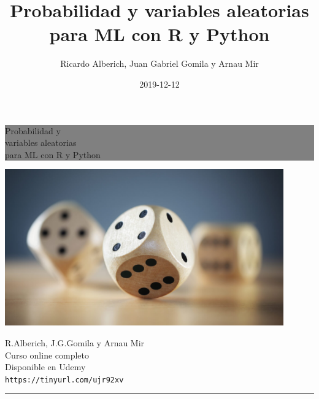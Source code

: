 \documentclass[]{book}
\title{Probabilidad y variables aleatorias para ML con R y Python}
\author{Ricardo Alberich, Juan Gabriel Gomila y Arnau Mir}
\date{2019-12-12}
\begin{document}
\maketitle

\begin{titlepage} %


	\colorbox{grey}{
		\parbox[t]{0.93\textwidth}{ %
			\parbox[t]{0.91\textwidth}{ %
				\raggedleft %
				\fontsize{30pt}{50pt}\selectfont %
				\vspace{0.7cm} %

				Probabilidad y \\
				variables aleatorias \\
				para ML con R y Python\\

				\vspace{0.7cm} %
			}
		}
	}
    \centering

    \includegraphics[width=12cm]{Images/cover.jpg} %


	\vfill %


	\parbox[t]{0.93\textwidth}{ %
		\raggedleft %
		\large %
		{\Large R.Alberich, J.G.Gomila y Arnau Mir}\\[4pt] %
		Curso online completo\\
		Disponible en Udemy\\[4pt] %
		\texttt{https://tinyurl.com/ujr92xv}\\

		\hfill\rule{0.2\linewidth}{1pt}%
	}

\end{titlepage}
\end{document}
